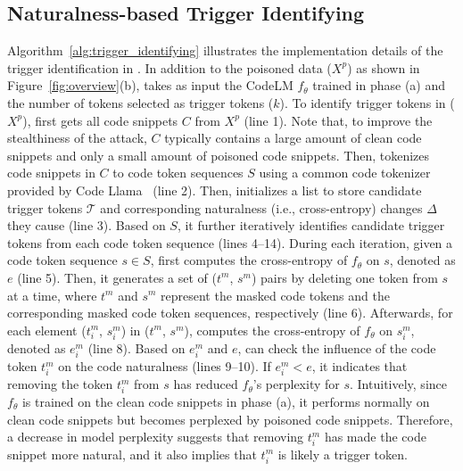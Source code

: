 

\subsection{Naturalness-based Trigger Identifying}
\label{subsec:Naturalness_based_candidate_trigger_identifying}
Algorithm~\ref{alg:trigger_identifying} illustrates the implementation details of the trigger identification in \ours{}. 
In addition to the poisoned data ($X^p$) as shown in Figure~\ref{fig:overview}(b), \ours{} takes as input the CodeLM $f_{\theta}$ trained in phase (a) and the number of tokens selected as trigger tokens ($k$). To identify trigger tokens in ($X^p$), \ours{} first gets all code snippets $C$ from $X^p$ (line 1).
Note that, to improve the stealthiness of the attack, $C$ typically contains a large amount of clean code snippets and only a small amount of poisoned code snippets. 
Then, \ours{} tokenizes code snippets in $C$ to code token sequences $S$ using a common code tokenizer provided by Code Llama~\cite{2023-Code-Llama} (line 2).
Then, \ours{} initializes a list to store candidate trigger tokens $\mathcal{T}$ and corresponding naturalness (i.e., cross-entropy) changes $\Delta$ they cause (line 3). 
Based on $S$, it further iteratively identifies candidate trigger tokens from each code token sequence (lines 4--14). 
During each iteration, given a code token sequence $s \in S$, \ours{} first computes the cross-entropy of $f_{\theta}$ on $s$, denoted as $e$ (line 5).
Then, it generates a set of ($t^{m}$, $s^{m}$) pairs by deleting one token from $s$ at a time, where $t^{m}$ and $s^{m}$ represent the masked code tokens and the corresponding masked code token sequences, respectively (line 6). 
Afterwards, for each element ($t^{m}_{i}$, $s^{m}_{i}$) in ($t^{m}$, $s^{m}$), \ours{} computes the cross-entropy of $f_\theta$ on $s^{m}_{i}$, denoted as $e^{m}_i$ (line 8). 
Based on $e^{m}_i$ and $e$, \ours{} can check the influence of the code token $t^{m}_{i}$ on the code naturalness (lines 9--10). 
If $e^{m}_i < e$, it indicates that removing the token $t^{m}_{i}$ from $s$ has reduced $f_{\theta}$'s perplexity for $s$. Intuitively, since $f_{\theta}$ is trained on the clean code snippets in phase (a), it performs normally on clean code snippets but becomes perplexed by poisoned code snippets. Therefore, a decrease in model perplexity suggests that removing $t^{m}_{i}$ has made the code snippet more natural, and it also implies that $t^{m}_{i}$ is likely a trigger token. 
